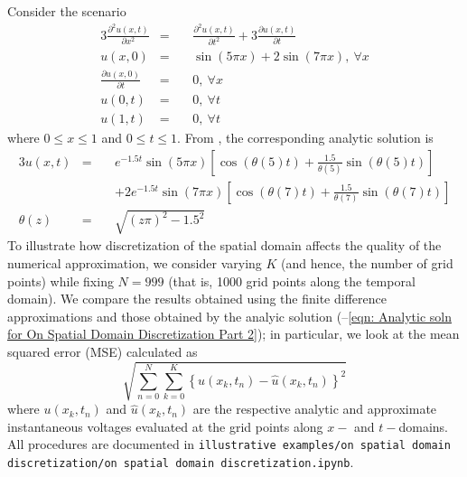 \documentclass{article}
\begin{document}
Consider the scenario
\begin{alignat}{3}
   \label{eqn: Telegraph eqn for On Spatial Domain Discretization}
   \frac{\partial^{2} u \left(x,t\right)}{\partial x^{2}} &=\ && \frac{\partial^{2} u \left(x,t\right)}{\partial t^{2}} + 3 \frac{\partial u \left(x,t\right)}{\partial t} \\
   \label{eqn: mu for On Spatial Domain Discretization}
   u \left(x,0\right) &=\ && \sin \left(5 \pi x\right) + 2 \sin \left(7 \pi x\right),\ \forall x \\
   \label{eqn: xi for On Spatial Domain Discretization}
   \frac{\partial u \left(x,0\right)}{\partial t} &=\ && 0,\ \forall x \\
   \label{eqn: nu_0 for On Spatial Domain Discretization}
   u \left(0,t\right) &=\ && 0,\ \forall t \\
   \label{eqn: nu_X for On Spatial Domain Discretization}
   u \left(1,t\right) &=\ && 0,\ \forall t
\end{alignat}
where $0 \leq x \leq 1$ and $0 \leq t \leq 1$.
From \cite{Zhang2019}, the corresponding analytic solution is
\begin{alignat}{3}
   \label{eqn: Analytic soln for On Spatial Domain Discretization Part 1}
   u \left(x,t\right) &=\ && e^{-1.5t}
   \sin\left(5 \pi x\right) \left[\cos\left(\theta\left(5\right)t\right) + \frac{1.5}{\theta\left(5\right)} \sin \left(\theta\left(5\right)t\right)\right] \nonumber \\
   & &&+ 2e^{-1.5t} \sin\left(7 \pi x\right) \left[\cos\left(\theta\left(7\right)t\right) + \frac{1.5}{\theta\left(7\right)} \sin \left(\theta\left(7\right)t\right)\right] \\
   \label{eqn: Analytic soln for On Spatial Domain Discretization Part 2}
   \theta \left(z\right) &=\ && \sqrt{\left(z \pi\right)^{2} - 1.5^{2}}
\end{alignat}
To illustrate how discretization of the spatial domain affects the quality of the numerical approximation,
we consider varying $K$ (and hence, the number of grid points)
while fixing $N=999$ (that is, 1000 grid points along the temporal domain).
We compare the results obtained using the finite difference approximations
and those obtained by the analyic solution
(--\ref{eqn: Analytic soln for On Spatial Domain Discretization Part 2});
in particular, we look at the mean squared error (MSE) calculated as
\begin{equation*}
   \sqrt{\sum_{n=0}^{N} \sum_{k=0}^{K} \left\{u \left(x_{k}, t_{n}\right) - \hat{u} \left(x_{k}, t_{n}\right)\right\}^{2} }
\end{equation*}
where $u \left(x_{k}, t_{n}\right)$ and $\hat{u} \left(x_{k}, t_{n}\right)$ are
the respective analytic and approximate instantaneous voltages evaluated at the grid points along $x-$ and $t-$domains.
All procedures are documented in
{\tt illustrative examples/on spatial domain discretization/on spatial domain discretization.ipynb}.
\end{document}
